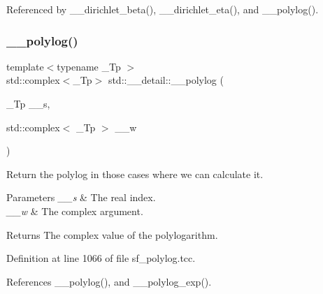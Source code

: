 Referenced by \+\_\+\+\_\+dirichlet\+\_\+beta(), \+\_\+\+\_\+dirichlet\+\_\+eta(), and \+\_\+\+\_\+polylog().

\mbox{\label{namespacestd_1_1____detail_aa14e3ca6e4bee5ac1f1e5e1c2cee1d5a}} 
\subsubsection{\texorpdfstring{\+\_\+\+\_\+polylog()}{\_\_polylog()}\hspace{0.1cm}{\footnotesize\ttfamily [2/2]}}
{\footnotesize\ttfamily template$<$typename \+\_\+\+Tp $>$ \\
std\+::complex$<$\+\_\+\+Tp$>$ std\+::\+\_\+\+\_\+detail\+::\+\_\+\+\_\+polylog (\begin{DoxyParamCaption}\item[{\+\_\+\+Tp}]{\+\_\+\+\_\+s,  }\item[{std\+::complex$<$ \+\_\+\+Tp $>$}]{\+\_\+\+\_\+w }\end{DoxyParamCaption})}

Return the polylog in those cases where we can calculate it.


\begin{DoxyParams}{Parameters}
{\em \+\_\+\+\_\+s} & The real index. \\
\hline
{\em \+\_\+\+\_\+w} & The complex argument. \\
\hline
\end{DoxyParams}
\begin{DoxyReturn}{Returns}
The complex value of the polylogarithm. 
\end{DoxyReturn}


Definition at line 1066 of file sf\+\_\+polylog.\+tcc.



References \+\_\+\+\_\+polylog(), and \+\_\+\+\_\+polylog\+\_\+exp().

\mbox{\label{namespacestd_1_1____detail_a31327d726731b1aad5502da2fb93b0e9}} 
